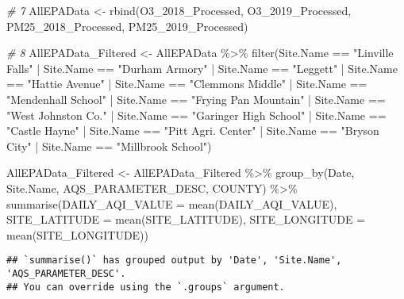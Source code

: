 \documentclass[
]{article}
\newenvironment{Shaded}{\begin{snugshade}}{\end{snugshade}}
\newcommand{\AttributeTok}[1]{\textcolor[rgb]{0.77,0.63,0.00}{#1}}
\newcommand{\CommentTok}[1]{\textcolor[rgb]{0.56,0.35,0.01}{\textit{#1}}}
\newcommand{\FunctionTok}[1]{\textcolor[rgb]{0.00,0.00,0.00}{#1}}
\newcommand{\NormalTok}[1]{#1}
\newcommand{\OtherTok}[1]{\textcolor[rgb]{0.56,0.35,0.01}{#1}}
\newcommand{\SpecialCharTok}[1]{\textcolor[rgb]{0.00,0.00,0.00}{#1}}
\newcommand{\StringTok}[1]{\textcolor[rgb]{0.31,0.60,0.02}{#1}}
\begin{document}
\begin{Shaded}
\begin{Highlighting}[]
\CommentTok{\# 7}
\NormalTok{AllEPAData }\OtherTok{\textless{}{-}} \FunctionTok{rbind}\NormalTok{(O3\_2018\_Processed, O3\_2019\_Processed, PM25\_2018\_Processed,}
\NormalTok{    PM25\_2019\_Processed)}

\CommentTok{\# 8}
\NormalTok{AllEPAData\_Filtered }\OtherTok{\textless{}{-}}\NormalTok{ AllEPAData }\SpecialCharTok{\%\textgreater{}\%}
    \FunctionTok{filter}\NormalTok{(Site.Name }\SpecialCharTok{==} \StringTok{"Linville Falls"} \SpecialCharTok{|}\NormalTok{ Site.Name }\SpecialCharTok{==} \StringTok{"Durham Armory"} \SpecialCharTok{|}
\NormalTok{        Site.Name }\SpecialCharTok{==} \StringTok{"Leggett"} \SpecialCharTok{|}\NormalTok{ Site.Name }\SpecialCharTok{==} \StringTok{"Hattie Avenue"} \SpecialCharTok{|}
\NormalTok{        Site.Name }\SpecialCharTok{==} \StringTok{"Clemmons Middle"} \SpecialCharTok{|}\NormalTok{ Site.Name }\SpecialCharTok{==} \StringTok{"Mendenhall School"} \SpecialCharTok{|}
\NormalTok{        Site.Name }\SpecialCharTok{==} \StringTok{"Frying Pan Mountain"} \SpecialCharTok{|}\NormalTok{ Site.Name }\SpecialCharTok{==} \StringTok{"West Johnston Co."} \SpecialCharTok{|}
\NormalTok{        Site.Name }\SpecialCharTok{==} \StringTok{"Garinger High School"} \SpecialCharTok{|}\NormalTok{ Site.Name }\SpecialCharTok{==} \StringTok{"Castle Hayne"} \SpecialCharTok{|}
\NormalTok{        Site.Name }\SpecialCharTok{==} \StringTok{"Pitt Agri. Center"} \SpecialCharTok{|}\NormalTok{ Site.Name }\SpecialCharTok{==} \StringTok{"Bryson City"} \SpecialCharTok{|}
\NormalTok{        Site.Name }\SpecialCharTok{==} \StringTok{"Millbrook School"}\NormalTok{)}

\NormalTok{AllEPAData\_Filtered }\OtherTok{\textless{}{-}}\NormalTok{ AllEPAData\_Filtered }\SpecialCharTok{\%\textgreater{}\%}
    \FunctionTok{group\_by}\NormalTok{(Date, Site.Name, AQS\_PARAMETER\_DESC, COUNTY) }\SpecialCharTok{\%\textgreater{}\%}
    \FunctionTok{summarise}\NormalTok{(}\AttributeTok{DAILY\_AQI\_VALUE =} \FunctionTok{mean}\NormalTok{(DAILY\_AQI\_VALUE), }\AttributeTok{SITE\_LATITUDE =} \FunctionTok{mean}\NormalTok{(SITE\_LATITUDE),}
        \AttributeTok{SITE\_LONGITUDE =} \FunctionTok{mean}\NormalTok{(SITE\_LONGITUDE))}
\end{Highlighting}
\end{Shaded}

\begin{verbatim}
## `summarise()` has grouped output by 'Date', 'Site.Name', 'AQS_PARAMETER_DESC'.
## You can override using the `.groups` argument.
\end{verbatim}
\end{document}
